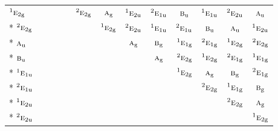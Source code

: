 \documentclass[10pt,a4paper]{article}
\numberwithin{equation}{section}
\newcommand{\irr}[1]{\text{\normalfont\scshape #1}}
\newcommand{\conjpair}[1]{{}^{#1}}
\newcommand{\ptag}[1]{\mathrm{#1}}
\begin{document}
{\begin{longtable}{@{}lcccccccccccc@{}}
$\conjpair{1}\irr{e}_{2\ptag{g}}$ &  &  &  &  & $\conjpair{2}\irr{e}_{2\ptag{g}}$ & $\irr{a}_{\ptag{g}}$ & $\conjpair{1}\irr{e}_{2\ptag{u}}$ & $\conjpair{2}\irr{e}_{1\ptag{u}}$ & $\irr{b}_{\ptag{u}}$ & $\conjpair{1}\irr{e}_{1\ptag{u}}$ & $\conjpair{2}\irr{e}_{2\ptag{u}}$ & $\irr{a}_{\ptag{u}}$\\*
$\conjpair{2}\irr{e}_{2\ptag{g}}$ &  &  &  &  &  & $\conjpair{1}\irr{e}_{2\ptag{g}}$ & $\conjpair{2}\irr{e}_{2\ptag{u}}$ & $\conjpair{1}\irr{e}_{1\ptag{u}}$ & $\conjpair{2}\irr{e}_{1\ptag{u}}$ & $\irr{b}_{\ptag{u}}$ & $\irr{a}_{\ptag{u}}$ & $\conjpair{1}\irr{e}_{2\ptag{u}}$\\*
$\irr{a}_{\ptag{u}}$ &  &  &  &  &  &  & $\irr{a}_{\ptag{g}}$ & $\irr{b}_{\ptag{g}}$ & $\conjpair{1}\irr{e}_{1\ptag{g}}$ & $\conjpair{2}\irr{e}_{1\ptag{g}}$ & $\conjpair{1}\irr{e}_{2\ptag{g}}$ & $\conjpair{2}\irr{e}_{2\ptag{g}}$\\*
$\irr{b}_{\ptag{u}}$ &  &  &  &  &  &  &  & $\irr{a}_{\ptag{g}}$ & $\conjpair{2}\irr{e}_{2\ptag{g}}$ & $\conjpair{1}\irr{e}_{2\ptag{g}}$ & $\conjpair{2}\irr{e}_{1\ptag{g}}$ & $\conjpair{1}\irr{e}_{1\ptag{g}}$\\*
$\conjpair{1}\irr{e}_{1\ptag{u}}$ &  &  &  &  &  &  &  &  & $\conjpair{1}\irr{e}_{2\ptag{g}}$ & $\irr{a}_{\ptag{g}}$ & $\irr{b}_{\ptag{g}}$ & $\conjpair{2}\irr{e}_{1\ptag{g}}$\\*
$\conjpair{2}\irr{e}_{1\ptag{u}}$ &  &  &  &  &  &  &  &  &  & $\conjpair{2}\irr{e}_{2\ptag{g}}$ & $\conjpair{1}\irr{e}_{1\ptag{g}}$ & $\irr{b}_{\ptag{g}}$\\*
$\conjpair{1}\irr{e}_{2\ptag{u}}$ &  &  &  &  &  &  &  &  &  &  & $\conjpair{2}\irr{e}_{2\ptag{g}}$ & $\irr{a}_{\ptag{g}}$\\*
$\conjpair{2}\irr{e}_{2\ptag{u}}$ &  &  &  &  &  &  &  &  &  &  &  & $\conjpair{1}\irr{e}_{2\ptag{g}}$\\
\bottomrule\end{longtable}}
\end{document}
